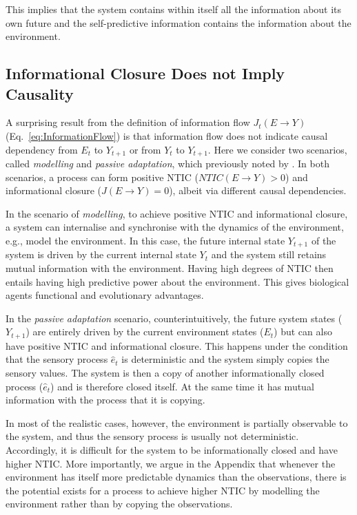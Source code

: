 \documentclass[utf8]{article}
\begin{document}
			\noindent
			This implies that the system contains within itself all the information about its own future and the self-predictive information contains the information about the environment. 
			
			\subsection{Informational Closure Does not Imply Causality}\label{sec:causality}
                A surprising result from the definition of information flow $J_t(E\rightarrow Y)$ (Eq.~\ref{eq:InformationFlow}) is that information flow does not indicate causal dependency from $E_t$ to $Y_{t+1}$ or from $Y_t$ to $Y_{t+1}$. Here we consider two scenarios, called \textit{modelling} and \textit{passive adaptation}, which previously noted by \citet{BERTSCHINGER.2006}. In both scenarios, a process can form positive NTIC ($NTIC(E\rightarrow Y)> 0$) and informational closure ($J(E\rightarrow Y)=0$), albeit via different causal dependencies.
                
                In the scenario of \textit{modelling}, to achieve positive NTIC and informational closure, a system can internalise and synchronise with the dynamics of the environment, e.g., model the environment. In this case, the future internal state $Y_{t+1}$ of the system is driven by the current internal state $Y_t$ and the system still retains mutual information with the environment. Having high degrees of NTIC then entails having high predictive power about the environment. This gives biological agents functional and evolutionary advantages.
                
                In the \textit{passive adaptation} scenario, counterintuitively, the future system states ($Y_{t+1}$) are  entirely driven by the current environment states ($E_t$) but can also have positive NTIC and informational closure. This happens under the condition that the sensory process $\hat{e}_t$ is deterministic and the system simply copies the sensory values. The system is then a copy of another informationally closed process ($\hat{e}_t$) and is therefore closed itself. At the same time it has mutual information with the process that it is copying. 
                
                In most of the realistic cases, however, the environment is partially observable to the system, and thus the sensory process is usually not deterministic. Accordingly, it is difficult for the system to be informationally closed and have higher NTIC.
                More importantly, we argue in the Appendix that whenever the environment has itself more predictable dynamics than the observations, there is the potential exists for a process to achieve higher NTIC by modelling the environment rather than by copying the observations. 
                
\end{document}
